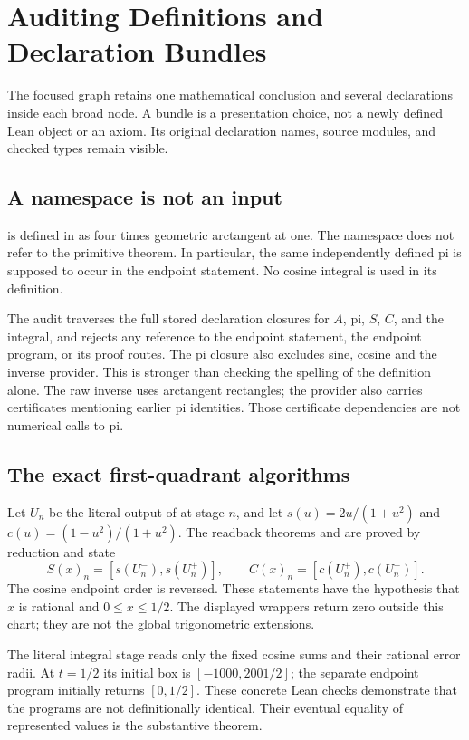 \chapter{Auditing Definitions and Declaration Bundles}\label{ch:definition-audit}

\href{cosine-primitive-graph.html}{The focused graph} retains one mathematical
conclusion and several declarations inside each broad node. A bundle is a
presentation choice, not a newly defined Lean object or an axiom. Its original
declaration names, source modules, and checked types remain visible.

\section{A namespace is not an input}
 is defined in
 as four times geometric arctangent at one.
The namespace  does not refer to the primitive theorem.
In particular, the same independently defined pi is supposed to occur in the
endpoint statement. No cosine integral is used in its definition.

The audit traverses the full stored declaration closures for $A$, pi, $S$,
$C$, and the integral, and rejects any reference to the endpoint statement,
the endpoint program, or its proof routes. The pi closure also excludes
sine, cosine and the inverse provider. This is stronger than checking the
spelling of the definition alone. The raw inverse uses arctangent rectangles;
the provider also carries certificates mentioning earlier pi identities.
Those certificate dependencies are not numerical calls to pi.

\section{The exact first-quadrant algorithms}
Let $U_n$ be the literal output of  at
stage $n$, and let $s(u)=2u/(1+u^2)$ and $c(u)=(1-u^2)/(1+u^2)$.
The readback theorems  and
 are proved by reduction and state
\[
 S(x)_n=[s(U_n^-),s(U_n^+)],\qquad
 C(x)_n=[c(U_n^+),c(U_n^-)].
\]
The cosine endpoint order is reversed. These statements have the hypothesis
that $x$ is rational and $0\le x\le1/2$. The displayed wrappers return zero
outside this chart; they are not the global trigonometric extensions.

The literal integral stage reads only the fixed cosine sums and their
rational error radii. At $t=1/2$ its initial box is $[-1000,2001/2]$; the
separate endpoint program initially returns $[0,1/2]$. These concrete Lean
checks demonstrate that the programs are not definitionally identical.
Their eventual equality of represented values is the substantive theorem.

